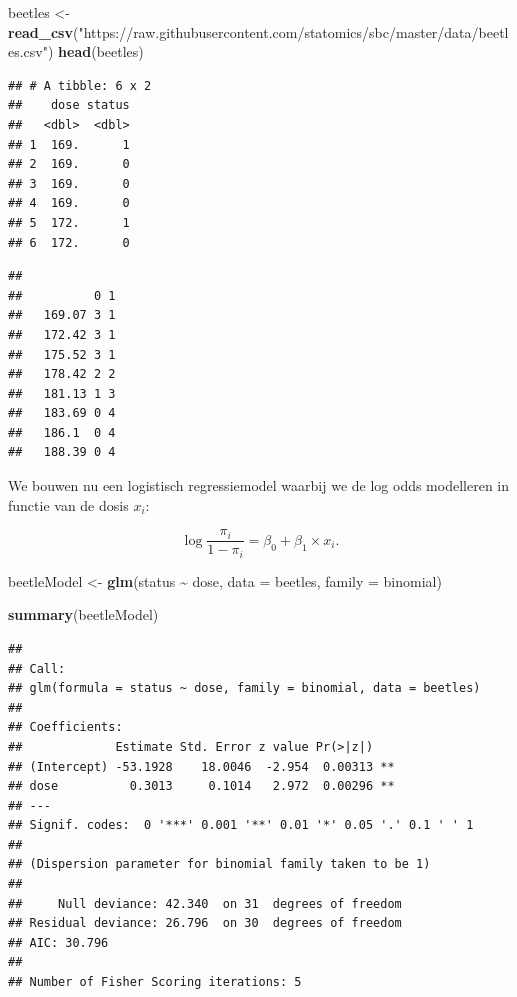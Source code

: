 \documentclass[
  12pt,dutch]{book}
\newenvironment{Shaded}{\begin{snugshade}}{\end{snugshade}}
\newcommand{\AttributeTok}[1]{\textcolor[rgb]{0.13,0.29,0.53}{#1}}
\newcommand{\FunctionTok}[1]{\textcolor[rgb]{0.13,0.29,0.53}{\textbf{#1}}}
\newcommand{\NormalTok}[1]{#1}
\newcommand{\OtherTok}[1]{\textcolor[rgb]{0.56,0.35,0.01}{#1}}
\newcommand{\SpecialCharTok}[1]{\textcolor[rgb]{0.81,0.36,0.00}{\textbf{#1}}}
\newcommand{\StringTok}[1]{\textcolor[rgb]{0.31,0.60,0.02}{#1}}
\theoremstyle{definition}
\theoremstyle{definition}
\theoremstyle{definition}
\theoremstyle{definition}
\theoremstyle{remark}
\begin{document}
\begin{Shaded}
\begin{Highlighting}[]
\NormalTok{beetles }\OtherTok{\textless{}{-}} \FunctionTok{read\_csv}\NormalTok{(}\StringTok{"https://raw.githubusercontent.com/statomics/sbc/master/data/beetles.csv"}\NormalTok{)}
\FunctionTok{head}\NormalTok{(beetles)}
\end{Highlighting}
\end{Shaded}

\begin{verbatim}
## # A tibble: 6 x 2
##    dose status
##   <dbl>  <dbl>
## 1  169.      1
## 2  169.      0
## 3  169.      0
## 4  169.      0
## 5  172.      1
## 6  172.      0
\end{verbatim}

\begin{Shaded}
\end{Shaded}

\begin{verbatim}
##         
##          0 1
##   169.07 3 1
##   172.42 3 1
##   175.52 3 1
##   178.42 2 2
##   181.13 1 3
##   183.69 0 4
##   186.1  0 4
##   188.39 0 4
\end{verbatim}

We bouwen nu een logistisch regressiemodel waarbij we de log odds modelleren in functie van de dosis \(x_i\):

\[\log \frac{\pi_i}{1-\pi_i}=\beta_0+\beta_1 \times x_i.\]

\begin{Shaded}
\begin{Highlighting}[]
\NormalTok{beetleModel }\OtherTok{\textless{}{-}} \FunctionTok{glm}\NormalTok{(status }\SpecialCharTok{\textasciitilde{}}\NormalTok{ dose, }\AttributeTok{data =}\NormalTok{ beetles, }\AttributeTok{family =}\NormalTok{ binomial)}

\FunctionTok{summary}\NormalTok{(beetleModel)}
\end{Highlighting}
\end{Shaded}

\begin{verbatim}
## 
## Call:
## glm(formula = status ~ dose, family = binomial, data = beetles)
## 
## Coefficients:
##             Estimate Std. Error z value Pr(>|z|)   
## (Intercept) -53.1928    18.0046  -2.954  0.00313 **
## dose          0.3013     0.1014   2.972  0.00296 **
## ---
## Signif. codes:  0 '***' 0.001 '**' 0.01 '*' 0.05 '.' 0.1 ' ' 1
## 
## (Dispersion parameter for binomial family taken to be 1)
## 
##     Null deviance: 42.340  on 31  degrees of freedom
## Residual deviance: 26.796  on 30  degrees of freedom
## AIC: 30.796
## 
## Number of Fisher Scoring iterations: 5
\end{verbatim}
\end{document}
